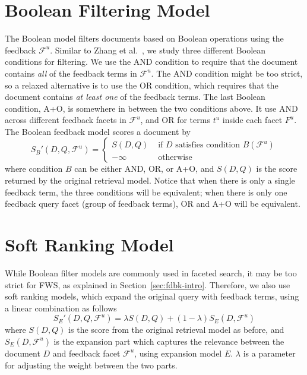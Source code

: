 \section{Boolean Filtering Model} \label{sec:fdbk-filter}
The Boolean model filters documents based on Boolean operations using the feedback $\mathcal{F}^u$. Similar to Zhang et al.~\cite{zhang2010interactive}, we study three different Boolean conditions for filtering. We use the AND condition to require that the document contains \emph{all} of the feedback terms in $\mathcal{F}^u$. The AND condition might be too strict, so a relaxed alternative is to use the OR condition, which requires that the document contains \emph{at least one} of the feedback terms. The last Boolean condition, A+O, is somewhere in between the two conditions above. It use AND across different feedback facets in $\mathcal{F}^u$, and OR for terms $t^u$ inside each facet $F^u$. The Boolean feedback model scores a document by
\begin{equation}
S_{B}'(D,Q,\mathcal{F}^u) = \left\{ \begin{array}{ll}
S(D,Q) &\mbox{ if $D$ satisfies condition $B(\mathcal{F}^u)$} \\
-\infty &\mbox{ otherwise}
\end{array} \right.
\end{equation}
where condition $B$ can be either AND, OR, or A+O, and $S(D,Q)$ is the score returned by the original retrieval model. Notice that when there is only a single feedback term, the three conditions will be equivalent; when there is only one feedback query facet (group of feedback terms), OR and A+O will be equivalent.

\section{Soft Ranking Model} \label{sec:fdbk-ranking}
While Boolean filter models are commonly used in faceted search, it may be too strict for FWS, as explained in Section~\ref{sec:fdbk-intro}. %
Therefore, we also use soft ranking models, which expand the original query with feedback terms, using a linear combination as follows
\begin{equation}
 S_E'(D,Q,\mathcal{F}^u) = \lambda S(D,Q) + (1-\lambda) S_E(D,\mathcal{F}^u)
\end{equation}
where $S(D,Q)$ is the score from the original retrieval model as before, and $S_E(D,\mathcal{F}^u)$ is the expansion part which captures the relevance between the document $D$ and feedback facet $\mathcal{F}^u$, using expansion model $E$. $\lambda$ is a parameter for adjusting the weight between the two parts.

